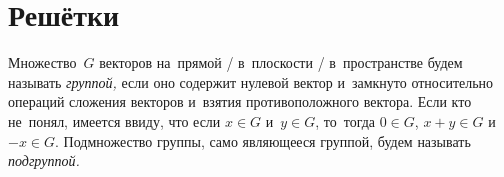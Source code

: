 

\section*{Решётки}


\begingroup
    \def\abs#1{\lvert #1 \rvert}%

Множество~$G$ векторов на~прямой / в~плоскости / в~пространстве будем называть
\emph{группой,} если оно содержит нулевой вектор и~замкнуто относительно
операций сложения векторов и~взятия противоположного вектора.
Если кто не~понял, имеется ввиду, что если $x \in G$ и~$y \in G$, то~тогда
$0 \in G$, $x + y \in G$ и~$-x \in G$.
Подмножество группы, само являющееся группой, будем называть \emph{подгруппой.}

